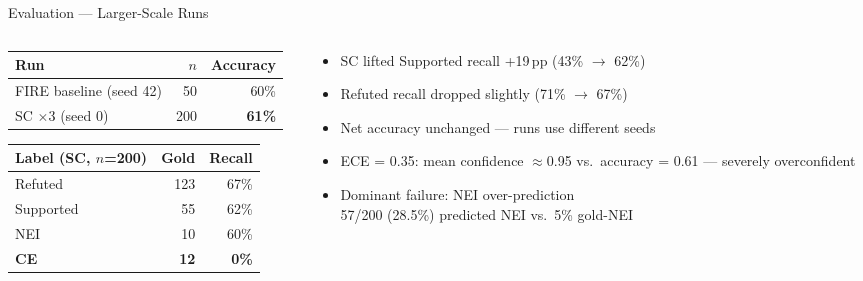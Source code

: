 \documentclass[11pt, aspectratio=169]{beamer}
\begin{document}
\begin{frame}{Evaluation — Larger-Scale Runs}
  \begin{columns}[T]
    \begin{column}{0.42\textwidth}
      \renewcommand{\arraystretch}{1.3}
      \begin{tabular}{lrr}
        \toprule
        Run & $n$ & Accuracy \\
        \midrule
        FIRE baseline (seed 42) & 50  & 60\% \\
        SC $\times 3$ (seed 0)  & 200 & \textbf{61\%} \\
        \bottomrule
      \end{tabular}

      \bigskip
      \begin{tabular}{lrr}
        \toprule
        Label (SC, $n$=200) & Gold & Recall \\
        \midrule
        Refuted             & 123 & 67\% \\
        Supported           &  55 & 62\% \\
        NEI                 &  10 & 60\% \\
        \rowcolor{crimson!15}
        \textbf{CE}         & \textbf{12} & \textbf{0\%} \\
        \bottomrule
      \end{tabular}
    \end{column}
    \begin{column}{0.52\textwidth}
      \begin{itemize}\setlength{\itemsep}{10pt}
        \item SC lifted Supported recall \alert{+19\,pp} (43\% $\to$ 62\%)
        \item Refuted recall dropped slightly (71\% $\to$ 67\%)
        \item Net accuracy unchanged — runs use different seeds
        \item ECE = 0.35: mean confidence $\approx$0.95 vs.\ accuracy = 0.61 — severely overconfident
        \item Dominant failure: NEI over-prediction\\
              {\small 57/200 (28.5\%) predicted NEI vs.\ 5\% gold-NEI}
      \end{itemize}
    \end{column}
  \end{columns}
\end{frame}
\end{document}
